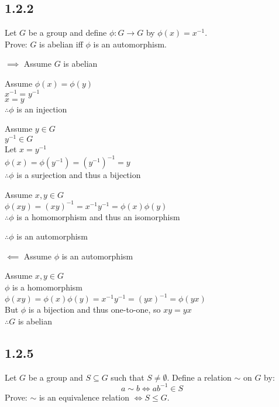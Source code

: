 \documentclass[letterpaper,12pt,fleqn]{article}
\newcommand{\p}{\phi}
\renewcommand{\r}{\sim}
\begin{document}
\subsection*{1.2.2}

Let $G$ be a group and define $\p:G\to G$ by $\p(x)=x^{-1}$. \\
Prove: $G$ is abelian iff $\p$ is an automorphism.

\begin{description}
\item $\implies$ Assume $G$ is abelian

  Assume $\p(x)=\p(y)$ \\
  $x^{-1}=y^{-1}$ \\
  $x=y$ \\
  $\therefore\p$ is an injection

  Assume $y\in G$ \\
  $y^{-1}\in G$ \\
  Let $x=y^{-1}$ \\
  $\p(x)=\p(y^{-1})=(y^{-1})^{-1}=y$ \\
  $\therefore\p$ is a surjection and thus a bijection

  Assume $x,y\in G$ \\
  $\p(xy)=(xy)^{-1}=x^{-1}y^{-1}=\p(x)\p(y)$ \\
  $\therefore\p$ is a homomorphism and thus an isomorphism

  $\therefore \p$ is an automorphism
  
\item $\impliedby$ Assume $\p$ is an automorphism

  Assume $x,y\in G$ \\
  $\p$ is a homomorphism \\
  $\p(xy)=\p(x)\p(y)=x^{-1}y^{-1}=(yx)^{-1}=\p(yx)$ \\
  But $\p$ is a bijection and thus one-to-one, so $xy=yx$ \\
  $\therefore G$ is abelian
\end{description}

\subsection*{1.2.5}

Let $G$ be a group and $S\subseteq G$ such that $S\ne\emptyset$. Define a
relation $\r$ on $G$ by:
\[a\r b\iff ab^{-1}\in S\]
Prove: $\r$ is an equivalence relation $\iff S\le G$.
\end{document}
